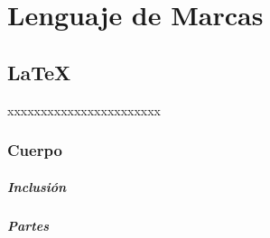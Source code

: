 \chapter{Lenguaje de Marcas}
	\section{LaTeX}
		xxxxxxxxxxxxxxxxxxxxxxx
		\subsection{Cuerpo}
			\paragraph{Inclusión}
			\paragraph{Partes}
